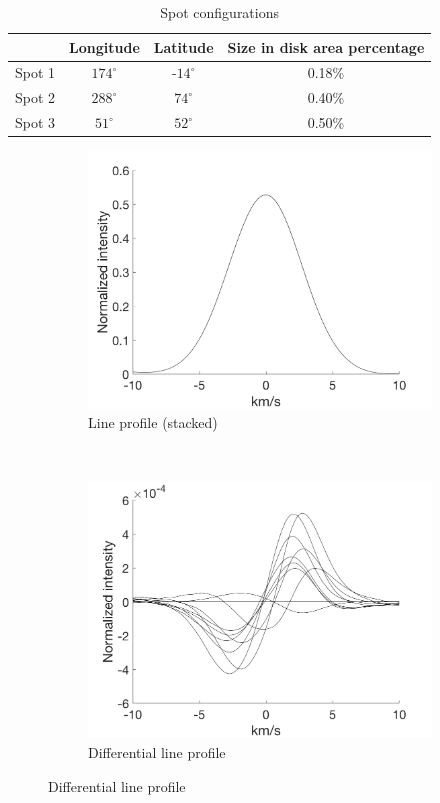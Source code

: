 \begin{table}[htbp]
\centering
\begin{tabular}{|c|c|c|c|}
\hline 
 & Longitude & Latitude & Size in disk area percentage\\ 
\hline 
Spot 1 & $174^\circ$ & -$14^\circ$ & 0.18\% \\ 
\hline 
Spot 2 & $288^\circ$ & $74^\circ$  & 0.40\% \\ 
\hline 
Spot 3 & $51^\circ$  & $52^\circ$  & 0.50\% \\ 
\hline 
\end{tabular} 
\caption{Spot configurations}
\label{table:spot_configurations}
\end{table}

\begin{figure}[tbp]
    \begin{subfigure}[b]{0.49\textwidth}
        \includegraphics[width=\textwidth]{./Figures/Methods/LPD1-Line_Profile.png}
        \caption{Line profile (stacked)}
    \end{subfigure}
	~
    \begin{subfigure}[b]{0.49\textwidth}
        \includegraphics[width=\textwidth]{./Figures/Methods/LPD1-Differential_line_Profile.png}
        \caption{Differential line profile}
        \label{fig:ld_dlp}
    \end{subfigure}	
    

\end{figure}
